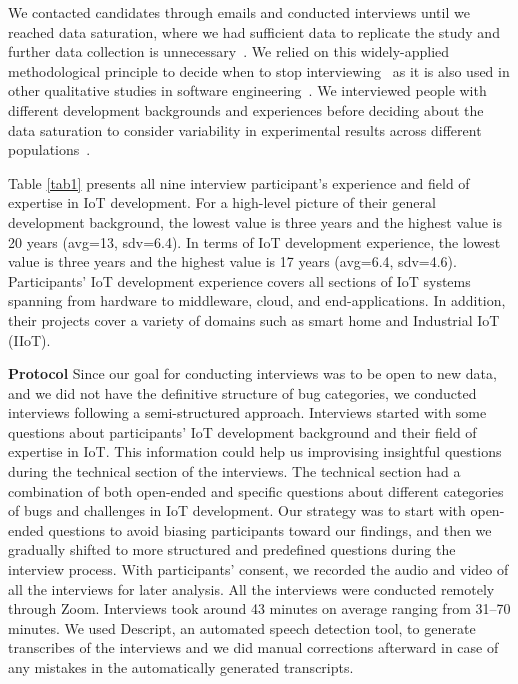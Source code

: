 We contacted candidates through emails and conducted interviews until we reached data saturation, where we had sufficient data to replicate the study and further data collection is unnecessary~\cite{dataSaturationFusch}. We relied on this widely-applied methodological principle to decide when to stop interviewing~\cite{saturationMorse,saturationGuest} as it is also used in other qualitative studies in software engineering~\cite{tweeter2014, aniche2018modern}. We interviewed people with different development backgrounds and experiences before deciding about the data saturation to consider variability in experimental results across different populations~\cite{henrich2010weirdest}. 


 Table \ref{tab1} presents all nine interview participant's experience and field of expertise in IoT development. For a high-level picture of their general development background, the lowest value is three years and the highest value is 20 years (avg=13, sdv=6.4). In terms of IoT development experience, the lowest value is three years and the highest value is 17 years (avg=6.4, sdv=4.6). Participants' IoT development experience covers all sections of IoT systems spanning from hardware to middleware, cloud, and end-applications. In addition, their projects cover a variety of domains such as smart home and Industrial IoT (IIoT). 

\textbf{Protocol} 
Since our goal for conducting interviews was to be open to new data, and we did not have the definitive structure of bug categories, we conducted interviews following a semi-structured approach. Interviews started with some questions about participants' IoT development background and their field of expertise in IoT. This information could help us improvising insightful questions during the technical section of the interviews. The technical section had a combination of both open-ended and specific questions about different categories of bugs and challenges in IoT development. Our strategy was to start with open-ended questions to avoid biasing participants toward our findings, and then we gradually shifted to more structured and predefined questions during the interview process.  With participants' consent, we recorded the audio and video of all the interviews for later analysis. All the interviews were conducted remotely through Zoom. Interviews took around 43 minutes on average ranging from 31--70 minutes. We used Descript, an automated speech detection tool, to generate transcribes of the interviews and we did manual corrections afterward in case of any mistakes in the automatically generated transcripts.

